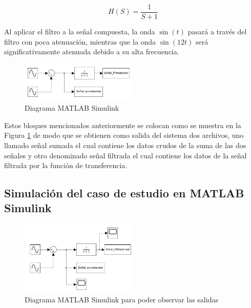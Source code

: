 \begin{equation}
    H(S) = \frac{1}{S+1}
    \label{eq:funcion_de_transferencia_filtro}
\end{equation}

Al aplicar el filtro a la señal compuesta,  la onda $\sin(t)$ pasará a través del filtro con poca atenuación, mientras que la onda $\sin(12t)$ será significativamente atenuada debido a su  alta frecuencia.

\begin{figure}[h!]
    \centering
    \includegraphics[width=0.5\textwidth]{fig/especifico_2/Diagrama matlab simulink.pdf}
    \caption{Diagrama MATLAB Simulink}
    \label{fig:diagrama_matlab_simulink}
\end{figure}

Estos bloques mencionados anteriormente se colocan como se muestra en la Figura \ref{fig:diagrama_matlab_simulink} de modo que se obtienen como salida del sistema dos archivos, uno llamado señal sumada el cual contiene los datos crudos de la suma de las dos señales y otro denominado señal filtrada el cual contiene los datos de la señal filtrada por la función de transferencia.

\subsection{Simulación del caso de estudio en MATLAB Simulink}\label{subsec:simulacion_caso_de_estudio}

\begin{figure}[h!]
    \centering
    \includegraphics[width=0.5\textwidth]{fig/especifico_2/Diagrama matlab simulink scope.pdf}
    \caption{Diagrama MATLAB Simulink para poder observar las salidas}
    \label{fig:diagrama_matlab_simulink_graficos}
\end{figure}

